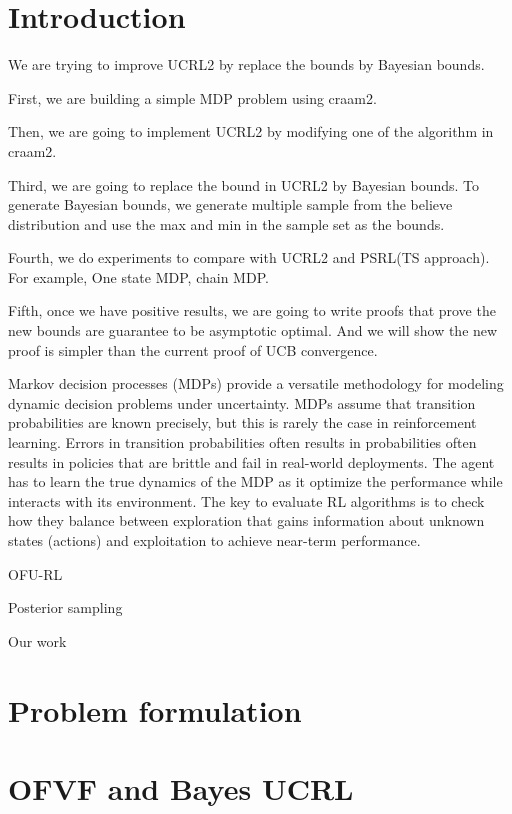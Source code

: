 \documentclass{article}
\begin{document}
\section{Introduction}
We are trying to improve UCRL2 by replace the bounds by Bayesian bounds.

First, we are building a simple MDP problem using craam2.

Then, we are going to implement UCRL2 by modifying one of the algorithm in craam2.

Third, we are going to replace the bound in UCRL2 by Bayesian bounds. To generate Bayesian bounds, we generate multiple sample from the believe distribution and use the max and min in the sample set as the bounds. 

Fourth, we do experiments to compare with UCRL2 and PSRL(TS approach). For example, One state MDP, chain MDP.

Fifth, once  we have positive results, we are going to write proofs that prove the new bounds are guarantee to be asymptotic optimal. And we will show the new proof is simpler than the current proof of UCB convergence. 

Markov decision processes (MDPs) provide a versatile methodology for modeling dynamic decision problems under uncertainty. MDPs assume that transition probabilities are known precisely, but this is rarely the case in reinforcement learning. Errors in transition probabilities often results in probabilities often results in policies that are brittle and fail in real-world deployments. The agent has to learn the true dynamics of the MDP as it optimize the performance while interacts with its environment. The key to evaluate RL algorithms is to check how they balance between exploration that gains information about unknown states (actions) and exploitation to  achieve near-term performance. 

OFU-RL

Posterior sampling

Our work


\section{Problem formulation}

\section{OFVF and Bayes UCRL}

\end{document}
